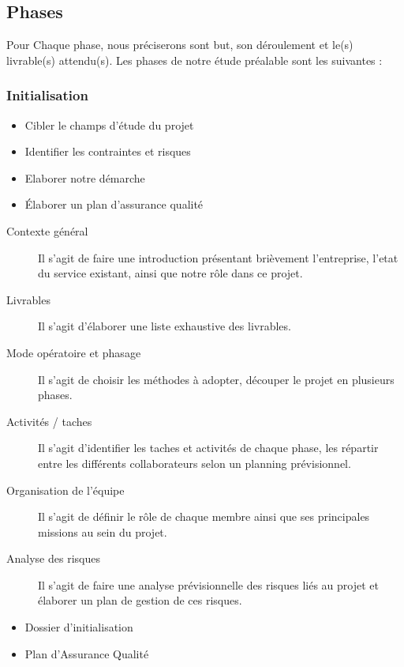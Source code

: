 {\subsection{Phases}

Pour Chaque phase, nous préciserons sont but, son déroulement et le(s) livrable(s) attendu(s). Les phases de notre étude préalable sont les suivantes :

\subsubsection{Initialisation}

\begin{itemize}
    \item Cibler le champs d’étude du projet
    \item Identifier les contraintes et risques
    \item Elaborer notre démarche
    \item Élaborer un plan d’assurance qualité
\end{itemize}


\begin{description}
    \item[Contexte général]{
        Il s’agit de faire une introduction présentant brièvement l’entreprise, l’etat du service existant, ainsi que notre rôle dans ce projet.
    }
    \item[Livrables]{
        Il s’agit d’élaborer une liste exhaustive des livrables.
    }
    \item[Mode opératoire et phasage]{
        Il s’agit de choisir les méthodes à adopter, découper le projet en plusieurs phases.
    }
    \item[Activités / taches]{
        Il s’agit d’identifier les taches et activités de chaque phase, les répartir entre les différents collaborateurs selon un planning prévisionnel.
    }
    \item[Organisation de l’équipe]{
        Il s’agit de définir le rôle de chaque membre ainsi que ses principales missions au sein du projet.
    }
    \item[Analyse des risques]{
        Il s’agit de faire une analyse prévisionnelle des risques liés au projet et élaborer un plan de gestion de ces risques.
    }
\end{description}

\begin{itemize}
    \item Dossier d’initialisation
    \item Plan d'Assurance Qualité
\end{itemize}

}
